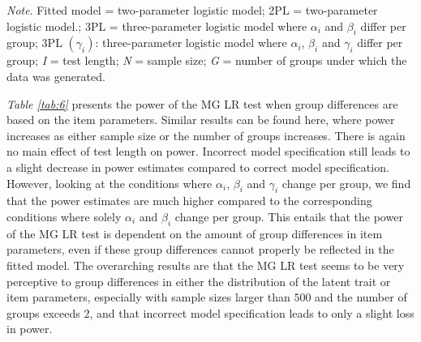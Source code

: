 \documentclass[Royal,sageapa,times,doublespace]{sagej}
\begin{document}
\begin{table}[ht!]
\bigskip
\small\textit{Note}. Fitted model = two-parameter logistic model; 2PL = two-parameter logistic model.; 3PL = three-parameter logistic model where $\alpha_i$ and $\beta_i$ differ per group; 3PL $ (\gamma_i)$: three-parameter logistic model where $\alpha_i$, $\beta_i$ and $\gamma_i$ differ per group; \textit{I} = test length; \textit{N} = sample size; \textit{G} = number of groups under which the data was generated.
\label{tab:6}
\end{table}

\indent \textit{Table \ref{tab:6}} presents the power of the MG LR test when group differences are based on the item parameters. Similar results can be found here, where power increases as either sample size or the number of groups increases. There is again no main effect of test length on power. Incorrect model specification still leads to a slight decrease in power estimates compared to correct model specification. However, looking at the conditions where $\alpha_i$, $\beta_i$ and $\gamma_i$ change per group, we find that the power estimates are much higher compared to the corresponding conditions where solely $\alpha_i$ and $\beta_i$ change per group. This entails that the power of the MG LR test is dependent on the amount of group differences in item parameters, even if these group differences cannot properly be reflected in the fitted model. The overarching results are that the MG LR test seems to be very perceptive to group differences in either the distribution of the latent trait or item parameters, especially with sample sizes larger than $500$ and the number of groups exceeds $2$, and that incorrect model specification leads to only a slight loss in power.\\
\end{document}
